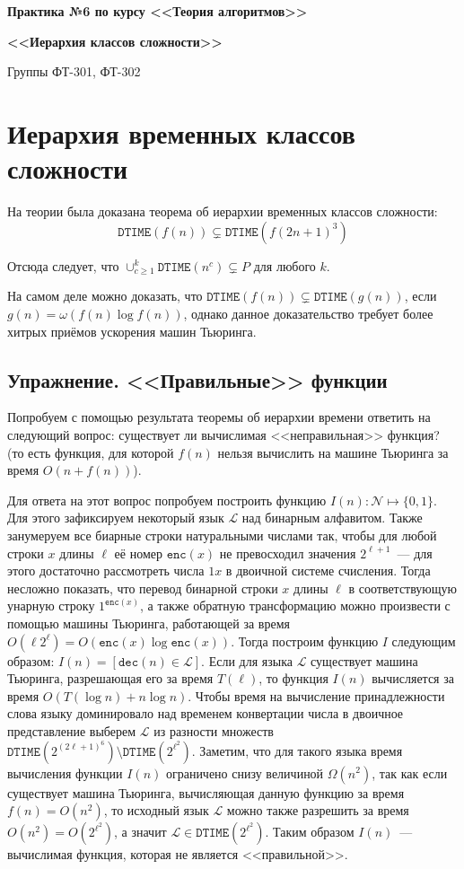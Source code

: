 \documentclass[
    11pt,
    a4paper
]{article}
\theoremstyle{definition}
\begin{document}
\centerline{\Large \bf Практика №6 по курсу <<Теория алгоритмов>>}
\centerline{\Large \bf <<Иерархия классов сложности>>}
\centerline{Группы ФТ-301, ФТ-302}

\section{Иерархия временных классов сложности}

На теории была доказана теорема об иерархии временных классов сложности:
$$\texttt{DTIME}(f(n)) \subsetneq \texttt{DTIME}(f(2n + 1)^3)$$

Отсюда следует, что $\cup_{c \geq 1}^k \texttt{DTIME}(n^c) \subsetneq P$ для любого $k$.

На самом деле можно доказать, что $\texttt{DTIME}(f(n)) \subsetneq \texttt{DTIME}(g(n))$, если $g(n) = \omega(f(n) \log f(n))$, однако данное доказательство требует более хитрых приёмов ускорения машин Тьюринга.

\subsection{Упражнение. <<Правильные>> функции}

Попробуем с помощью результата теоремы об иерархии времени ответить на следующий вопрос: существует ли вычислимая <<неправильная>> функция? (то есть функция, для которой $f(n)$ нельзя вычислить на машине Тьюринга за время $O(n + f(n))$).

Для ответа на этот вопрос попробуем построить функцию $I(n): \mathcal{N} \mapsto \{0, 1\}$. Для этого зафиксируем некоторый язык $\mathcal{L}$ над бинарным алфавитом. Также занумеруем все биарные строки натуральными числами так, чтобы для любой строки $x$ длины $\ell$ её номер $\texttt{enc}(x)$ не превосходил значения $2^{\ell + 1}$~--- для этого достаточно рассмотреть числа $1x$ в двоичной системе счисления. Тогда несложно показать, что перевод бинарной строки $x$ длины $\ell$ в соответствующую унарную строку $1^{\texttt{enc}(x)}$, а также обратную трансформацию можно произвести с помощью машины Тьюринга, работающей за время $O(\ell2^\ell) = O(\texttt{enc}(x) \log \texttt{enc}(x))$. Тогда построим функцию $I$ следующим образом: $I(n) = [\texttt{dec}(n) \in \mathcal{L}]$. Если для языка $\mathcal{L}$ существует машина Тьюринга, разрешающая его за время $T(\ell)$, то функция $I(n)$ вычисляется за время $O(T(\log n) + n \log n)$. Чтобы время на вычисление принадлежности слова языку доминировало над временем конвертации числа в двоичное представление выберем $\mathcal{L}$ из разности множеств $\texttt{DTIME}(2^{(2\ell + 1)^6}) \setminus \texttt{DTIME}(2^{\ell^2})$. Заметим, что для такого языка время вычисления функции $I(n)$ ограничено снизу величиной $\Omega(n^2)$, так как если существует машина Тьюринга, вычисляющая данную функцию за время $f(n) = O(n^2)$, то исходный язык $\mathcal{L}$ можно также разрешить за время $O(n^2) = O(2^{\ell^2})$, а значит $\mathcal{L} \in \texttt{DTIME}(2^{\ell^2})$. Таким образом $I(n)$~--- вычислимая функция, которая не является <<правильной>>.
\end{document}
